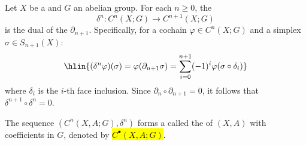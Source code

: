 \begin{definition} \label{definition:singular_cochain_complex_of_a_topological_space_with_coefficients_in_an_abelian_group}
Let $X$ be a  and $G$ an abelian group. For each $n \ge 0$, the 
$$\delta^n : C^n(X; G) \to C^{n+1}(X; G)$$
is the dual of the  $\partial_{n+1}$. Specifically, for a cochain $\varphi \in C^n(X; G)$ and a simplex $\sigma \in S_{n+1}(X)$:
$$\hlin{(\delta^n \varphi)(\sigma) = \varphi(\partial_{n+1} \sigma) = \sum_{i=0}^{n+1} (-1)^i \varphi(\sigma \circ \delta_i)}$$
where $\delta_i$ is the $i$-th face inclusion. Since $\partial_n \circ \partial_{n+1} = 0$, it follows that $\delta^{n+1} \circ \delta^n = 0$. 

The sequence $(C^n(X, A; G), \delta^n)$ forms a  called the  of $(X, A)$ with coefficients in $G$, denoted by \hl{$C^\bullet(X, A; G)$}.
\end{definition}